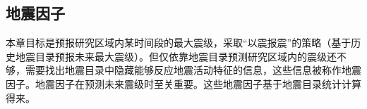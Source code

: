 

\subsection{地震因子}\label{sec:seism_indicator}

本章目标是预报研究区域内某时间段的最大震级，采取“以震报震”的策略（基于历史地震目录预报未来最大震级）。但仅依靠地震目录预测研究区域内的震级还不够，需要找出地震目录中隐藏能够反应地震活动特征的信息，这些信息被称作地震因子。地震因子在预测未来震级时至关重要。这些地震因子基于地震目录统计计算得来。

